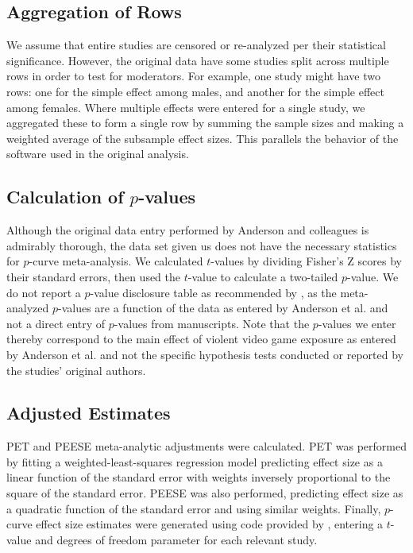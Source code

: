 \documentclass[man]{apa6}
\begin{document}
\subsection{Aggregation of Rows}
We assume that entire studies are censored or re-analyzed per their statistical significance. However, the original data have some studies split across multiple rows in order to test for moderators. For example, one study might have two rows: one for the simple effect among males, and another for the simple effect among females. Where multiple effects were entered for a single study, we aggregated these to form a single row by summing the sample sizes and making a weighted average of the subsample effect sizes. This parallels the behavior of the software used in the original analysis. 

\subsection{Calculation of $p$-values}
Although the original data entry performed by Anderson and colleagues is admirably thorough, the data set given us does not have the necessary statistics for $p$-curve meta-analysis. We calculated $t$-values by dividing Fisher's Z scores by their standard errors, then used the $t$-value to calculate a two-tailed $p$-value. We do not report a $p$-value disclosure table as recommended by \citet{Simonsohn:etal:2014}, as the meta-analyzed $p$-values are a function of the data as entered by Anderson et al. and not a direct entry of $p$-values from manuscripts.
Note that the $p$-values we enter thereby correspond to the main effect of violent video game exposure as entered by Anderson et al. and not the specific hypothesis tests conducted or reported by the studies' original authors.

\subsection{Adjusted Estimates}
PET and PEESE meta-analytic adjustments were calculated. PET was performed by fitting a weighted-least-squares regression model predicting effect size as a linear function of the standard error with weights inversely proportional to the square of the standard error. PEESE was also performed, predicting effect size as a quadratic function of the standard error and using similar weights. Finally, $p$-curve effect size estimates were generated using code provided by \citet{Simonsohn:etal:2014}, entering a $t$-value and degrees of freedom parameter for each relevant study.
\end{document}
